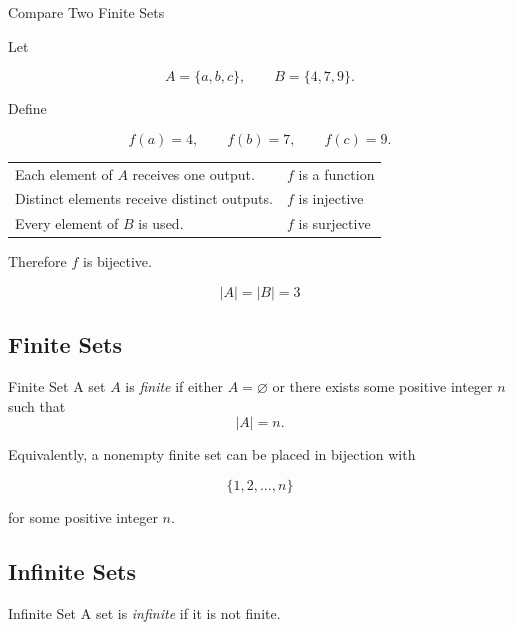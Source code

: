 \begin{workedexamplebox}{Compare Two Finite Sets}

Let

\[ A=\{a,b,c\},\qquad B=\{4,7,9\}. \]

Define

\[ f(a)=4,\qquad f(b)=7,\qquad f(c)=9. \]

\begin{tabularx}{\textwidth}{@{}>{\raggedright\arraybackslash}p{}X@{}}
Each element of \(A\) receives one output. & \(f\) is a function\\
Distinct elements receive distinct outputs. & \(f\) is injective\\
Every element of \(B\) is used. & \(f\) is surjective
\end{tabularx}

Therefore \(f\) is bijective.

\begin{answerbox}
\[ |A|=|B|=3 \]
\end{answerbox}
\end{workedexamplebox}

\subsection{Finite Sets}
\label{subsec:finite-sets}

\begin{definitionbox}{Finite Set}
A set \(A\) is \emph{finite} if either \(A=\varnothing\) or there exists some
positive integer \(n\) such that
\[ |A|=n. \]
\end{definitionbox}

Equivalently, a nonempty finite set can be placed in bijection with

\[ \{1,2,\ldots,n\} \]

for some positive integer \(n\).

\subsection{Infinite Sets}
\label{subsec:infinite-sets}

\begin{definitionbox}{Infinite Set}
A set is \emph{infinite} if it is not finite.
\end{definitionbox}


